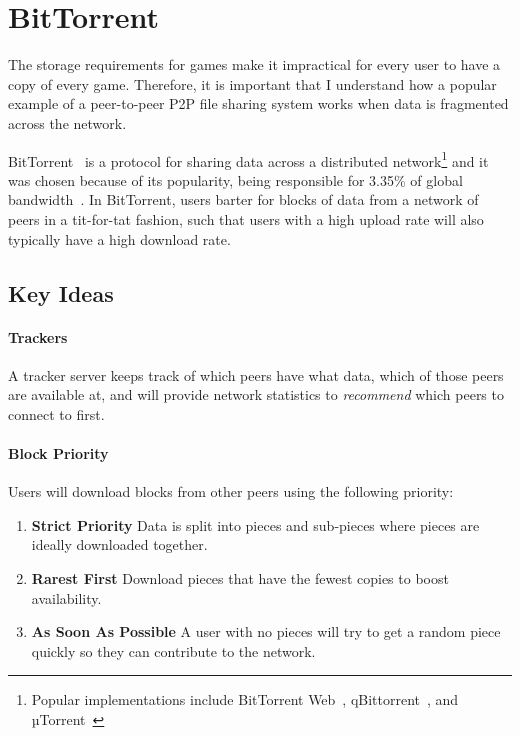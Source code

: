 
\section{BitTorrent}\label{sec:bittorrent}

The storage requirements for games make it impractical for every user to have a copy of every game. Therefore, it is important that I understand how a popular example of a peer-to-peer P2P file sharing system works when data is fragmented across the network.

\newparagraph
BitTorrent~\cite{kaune_unraveling_2010, pouwelse_bittorrent_2005} is a protocol for sharing data across a distributed network\footnote{Popular implementations include BitTorrent Web~\cite{inc_bittorrent_nodate}, qBittorrent~\cite{noauthor_qbittorrent_nodate}, and µTorrent~\cite{inc_torrent_nodate}} and 
it was chosen because of its popularity, being responsible for 3.35\% of global bandwidth~\cite{noauthor_application_nodate}. 
In BitTorrent, users barter for blocks of data from a network of peers in a tit-for-tat fashion, such that users with a high upload rate will also typically have a high download rate.

\subsection*{Key Ideas}

\paragraph*{Trackers}
A tracker server keeps track of which peers have what data, which of those peers are available at, and will provide network statistics to \textit{recommend} which peers to connect to first.

\paragraph*{Block Priority}
Users will download blocks from other peers using the following priority:
\begin{enumerate}
  \item \textbf{Strict Priority} Data is split into pieces and sub-pieces where pieces are ideally downloaded together.
  \item \textbf{Rarest First} Download pieces that have the fewest copies to boost availability.
  \item \textbf{As Soon As Possible} A user with no pieces will try to get a random piece quickly so they can contribute to the network. 
\end{enumerate}

